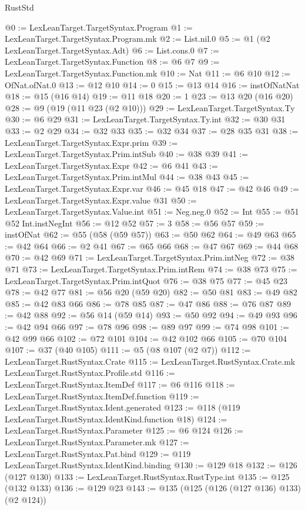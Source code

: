 \begin{lexlean}{RustStd}
\begin{coremodule}
@0 := LexLeanTarget.TargetSyntax.Program
@1 := LexLeanTarget.TargetSyntax.Program.mk
@2 := List.nil.{0}
@5 := @1 (@2 LexLeanTarget.TargetSyntax.Adt)
@6 := List.cons.{0}
@7 := LexLeanTarget.TargetSyntax.Function
@8 := @6 @7
@9 := LexLeanTarget.TargetSyntax.Function.mk
@10 := Nat
@11 := @6 @10
@12 := OfNat.ofNat.{0}
@13 := @12 @10
@14 := 0
@15 := @13 @14
@16 := instOfNatNat
@18 := @15 (@16 @14)
@19 := @11 @18
@20 := 1
@23 := @13 @20 (@16 @20)
@28 := @9 (@19 (@11 @23 (@2 @10)))
@29 := LexLeanTarget.TargetSyntax.Ty
@30 := @6 @29
@31 := LexLeanTarget.TargetSyntax.Ty.int
@32 := @30 @31
@33 := @2 @29
@34 := @32 @33
@35 := @32 @34
@37 := @28 @35 @31
@38 := LexLeanTarget.TargetSyntax.Expr.prim
@39 := LexLeanTarget.TargetSyntax.Prim.intSub
@40 := @38 @39
@41 := LexLeanTarget.TargetSyntax.Expr
@42 := @6 @41
@43 := LexLeanTarget.TargetSyntax.Prim.intMul
@44 := @38 @43
@45 := LexLeanTarget.TargetSyntax.Expr.var
@46 := @45 @18
@47 := @42 @46
@49 := LexLeanTarget.TargetSyntax.Expr.value @31
@50 := LexLeanTarget.TargetSyntax.Value.int
@51 := Neg.neg.{0}
@52 := Int
@55 := @51 @52 Int.instNegInt
@56 := @12 @52
@57 := 3
@58 := @56 @57
@59 := instOfNat
@62 := @55 (@58 (@59 @57))
@63 := @50 @62
@64 := @49 @63
@65 := @42 @64
@66 := @2 @41
@67 := @65 @66
@68 := @47 @67
@69 := @44 @68
@70 := @42 @69
@71 := LexLeanTarget.TargetSyntax.Prim.intNeg
@72 := @38 @71
@73 := LexLeanTarget.TargetSyntax.Prim.intRem
@74 := @38 @73
@75 := LexLeanTarget.TargetSyntax.Prim.intQuot
@76 := @38 @75
@77 := @45 @23
@78 := @42 @77
@81 := @56 @20 (@59 @20)
@82 := @50 @81
@83 := @49 @82
@85 := @42 @83 @66
@86 := @78 @85
@87 := @47 @86
@88 := @76 @87
@89 := @42 @88
@92 := @56 @14 (@59 @14)
@93 := @50 @92
@94 := @49 @93
@96 := @42 @94 @66
@97 := @78 @96
@98 := @89 @97
@99 := @74 @98
@101 := @42 @99 @66
@102 := @72 @101
@104 := @42 @102 @66
@105 := @70 @104
@107 := @37 (@40 @105)
@111 := @5 (@8 @107 (@2 @7))
@112 := LexLeanTarget.RustSyntax.Crate
@115 := LexLeanTarget.RustSyntax.Crate.mk LexLeanTarget.RustSyntax.Profile.std
@116 := LexLeanTarget.RustSyntax.ItemDef
@117 := @6 @116
@118 := LexLeanTarget.RustSyntax.ItemDef.function
@119 := LexLeanTarget.RustSyntax.Ident.generated
@123 := @118 (@119 LexLeanTarget.RustSyntax.IdentKind.function @18)
@124 := LexLeanTarget.RustSyntax.Parameter
@125 := @6 @124
@126 := LexLeanTarget.RustSyntax.Parameter.mk
@127 := LexLeanTarget.RustSyntax.Pat.bind
@129 := @119 LexLeanTarget.RustSyntax.IdentKind.binding
@130 := @129 @18
@132 := @126 (@127 @130)
@133 := LexLeanTarget.RustSyntax.RustType.int
@135 := @125 (@132 @133)
@136 := @129 @23
@143 := @135 (@125 (@126 (@127 @136) @133) (@2 @124))

\end{coremodule}
\end{lexlean}
